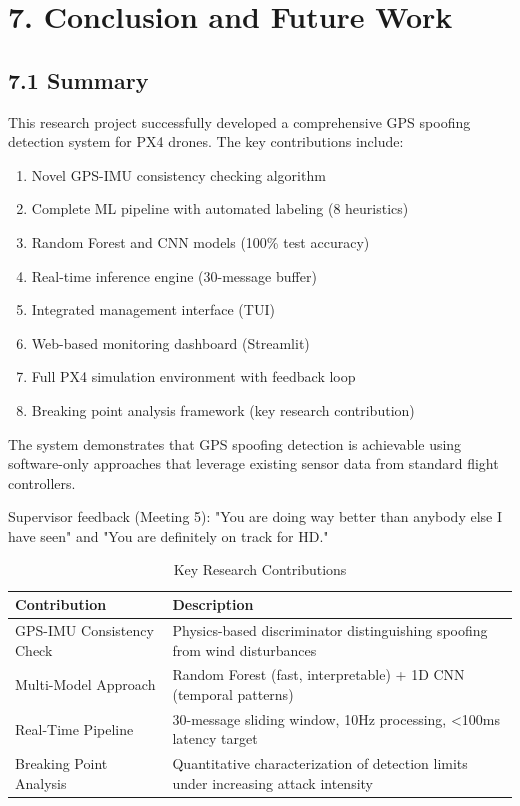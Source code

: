 \section{7. Conclusion and Future Work}

\subsection{7.1 Summary}

This research project successfully developed a comprehensive GPS spoofing detection system for PX4 drones. The key contributions include:

\begin{enumerate}
    \item Novel GPS-IMU consistency checking algorithm
    \item Complete ML pipeline with automated labeling (8 heuristics)
    \item Random Forest and CNN models (100\% test accuracy)
    \item Real-time inference engine (30-message buffer)
    \item Integrated management interface (TUI)
    \item Web-based monitoring dashboard (Streamlit)
    \item Full PX4 simulation environment with feedback loop
    \item Breaking point analysis framework (key research contribution)
\end{enumerate}

The system demonstrates that GPS spoofing detection is achievable using software-only approaches that leverage existing sensor data from standard flight controllers.

Supervisor feedback (Meeting 5): "You are doing way better than anybody else I have seen" and "You are definitely on track for HD."

\begin{table}[htbp]
    \centering
    \caption{Key Research Contributions}
    \label{tab:contributions}
    \begin{tabular}{|p{5cm}|p{10cm}|}
        \hline
        \textbf{Contribution} & \textbf{Description} \\
        \hline
        GPS-IMU Consistency Check & Physics-based discriminator distinguishing spoofing from wind disturbances \\
        \hline
        Multi-Model Approach & Random Forest (fast, interpretable) + 1D CNN (temporal patterns) \\
        \hline
        Real-Time Pipeline & 30-message sliding window, 10Hz processing, <100ms latency target \\
        \hline
        Breaking Point Analysis & Quantitative characterization of detection limits under increasing attack intensity \\
        \hline
    \end{tabular}
\end{table}

